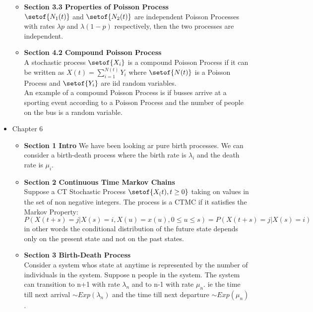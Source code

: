 \documentclass[answers,12pt,addpoints]{exam}
\begin{document}
\begin{itemize}
\begin{itemize}
        \item \textbf{Section 3.3 Properties of Poisson Process} \\
        $\setof{N_1(t)}$ and $\setof{N_2(t)}$ are independent Poisson Processes with rates $\lambda p $ and $\lambda (1-p)$ respectively, then the two processes are independent.
        \item \textbf{Section 4.2 Compound Poisson Process} \\
        A stochastic process $\setof{X_i}$ is a compound Poisson Process if it can be written as $X(t) = \sum_{i=1}^{N(t)} Y_i$ where $\setof{N(t)}$ is a Poisson Process and $\setof{Y_i}$ are iid random variables.\\
        An example of a compound Poisson Process is if busses arrive at a sporting event according to a Poisson Process and the number of people on the bus is a random variable.\\
    \end{itemize}
    \item Chapter 6
    \begin{itemize}
        \item \textbf{Section 1 Intro}
        We have been looking ar pure birth processes. We can consider a birth-death process where the birth rate is $\lambda_i$ and the death rate is $\mu_i$. 
        \item \textbf{Section 2 Continuous Time Markov Chains} \\
        Suppose a CT Stochastic Process $\setof{X_(t), t \geq 0}$ taking on values in the set of non negative integers. The process is a CTMC if it satisfies the Markov Property: $P(X(t+s) = j | X(s) = i, X(u) = x(u), 0 \leq u \leq s) = P(X(t+s) = j | X(s) = i)$ in other words the conditional distribution of the future state depends only on the present state and not on the past states.\\
        \item \textbf{Section 3 Birth-Death Process} \\
        Consider a system whos state at anytime is represented by the number of individuals in the system. Suppose n people in the system. The system can transition to n+1 with rate $\lambda_n$ and to n-1 with rate $\mu_n$. ie the time till next arrival $\sim Exp(\lambda_n)$ and the time till next departure $\sim Exp(\mu_n)$.\\

\end{itemize}
\end{itemize}
\end{document}
